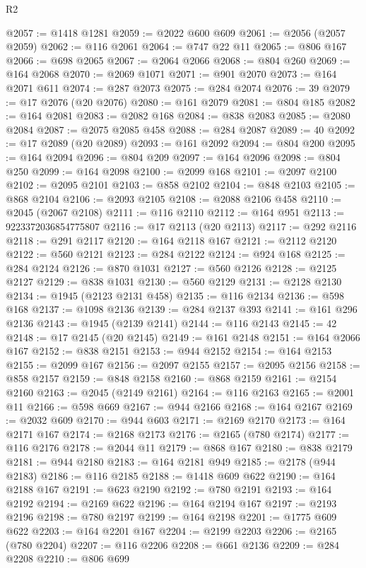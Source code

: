 \begin{lexlean}{R2}
\begin{coremodule}
@2057 := @1418 @1281
@2059 := @2022 @600 @609
@2061 := @2056 (@2057 @2059)
@2062 := @116 @2061
@2064 := @747 @22 @11
@2065 := @806 @167
@2066 := @698 @2065
@2067 := @2064 @2066
@2068 := @804 @260
@2069 := @164 @2068
@2070 := @2069 @1071
@2071 := @901 @2070
@2073 := @164 @2071 @611
@2074 := @287 @2073
@2075 := @284 @2074
@2076 := 39
@2079 := @17 @2076 (@20 @2076)
@2080 := @161 @2079
@2081 := @804 @185
@2082 := @164 @2081
@2083 := @2082 @168
@2084 := @838 @2083
@2085 := @2080 @2084
@2087 := @2075 @2085 @458
@2088 := @284 @2087
@2089 := 40
@2092 := @17 @2089 (@20 @2089)
@2093 := @161 @2092
@2094 := @804 @200
@2095 := @164 @2094
@2096 := @804 @209
@2097 := @164 @2096
@2098 := @804 @250
@2099 := @164 @2098
@2100 := @2099 @168
@2101 := @2097 @2100
@2102 := @2095 @2101
@2103 := @858 @2102
@2104 := @848 @2103
@2105 := @868 @2104
@2106 := @2093 @2105
@2108 := @2088 @2106 @458
@2110 := @2045 (@2067 @2108)
@2111 := @116 @2110
@2112 := @164 @951
@2113 := 9223372036854775807
@2116 := @17 @2113 (@20 @2113)
@2117 := @292 @2116
@2118 := @291 @2117
@2120 := @164 @2118 @167
@2121 := @2112 @2120
@2122 := @560 @2121
@2123 := @284 @2122
@2124 := @924 @168
@2125 := @284 @2124
@2126 := @870 @1031
@2127 := @560 @2126
@2128 := @2125 @2127
@2129 := @838 @1031
@2130 := @560 @2129
@2131 := @2128 @2130
@2134 := @1945 (@2123 @2131 @458)
@2135 := @116 @2134
@2136 := @598 @168
@2137 := @1098 @2136
@2139 := @284 @2137 @393
@2141 := @161 @296 @2136
@2143 := @1945 (@2139 @2141)
@2144 := @116 @2143
@2145 := 42
@2148 := @17 @2145 (@20 @2145)
@2149 := @161 @2148
@2151 := @164 @2066 @167
@2152 := @838 @2151
@2153 := @944 @2152
@2154 := @164 @2153
@2155 := @2099 @167
@2156 := @2097 @2155
@2157 := @2095 @2156
@2158 := @858 @2157
@2159 := @848 @2158
@2160 := @868 @2159
@2161 := @2154 @2160
@2163 := @2045 (@2149 @2161)
@2164 := @116 @2163
@2165 := @2001 @11
@2166 := @598 @669
@2167 := @944 @2166
@2168 := @164 @2167
@2169 := @2032 @609
@2170 := @944 @603
@2171 := @2169 @2170
@2173 := @164 @2171 @167
@2174 := @2168 @2173
@2176 := @2165 (@780 @2174)
@2177 := @116 @2176
@2178 := @2044 @11
@2179 := @868 @167
@2180 := @838 @2179
@2181 := @944 @2180
@2183 := @164 @2181 @949
@2185 := @2178 (@944 @2183)
@2186 := @116 @2185
@2188 := @1418 @609 @622
@2190 := @164 @2188 @167
@2191 := @623 @2190
@2192 := @780 @2191
@2193 := @164 @2192
@2194 := @2169 @622
@2196 := @164 @2194 @167
@2197 := @2193 @2196
@2198 := @780 @2197
@2199 := @164 @2198
@2201 := @1775 @609 @622
@2203 := @164 @2201 @167
@2204 := @2199 @2203
@2206 := @2165 (@780 @2204)
@2207 := @116 @2206
@2208 := @661 @2136
@2209 := @284 @2208
@2210 := @806 @699

\end{coremodule}
\end{lexlean}
